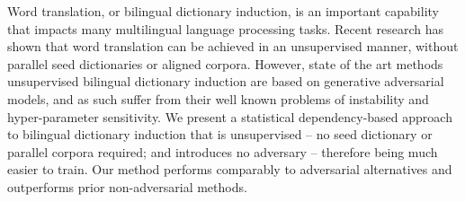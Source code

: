 Word translation, or bilingual dictionary induction, is an important capability that impacts many multilingual language processing tasks. Recent research has shown that  word translation can be achieved in an unsupervised manner, without parallel seed dictionaries or aligned corpora. However, state of the art methods unsupervised bilingual dictionary induction are based on generative adversarial models, and as such suffer from their well known problems of instability and hyper-parameter sensitivity. We present a statistical dependency-based approach to bilingual dictionary induction that is unsupervised -- no seed dictionary or parallel corpora required; and introduces no adversary -- therefore being much easier to train. Our method performs comparably to adversarial alternatives and outperforms prior non-adversarial methods.

